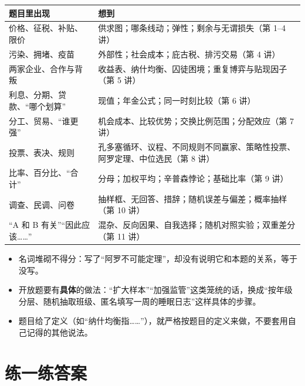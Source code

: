 \begin{center}
\small
\begin{tabular}{p{4.2cm}p{8.8cm}}
  \toprule
  题目里出现 & 想到 \\
  \midrule
  价格、征税、补贴、限价 & 供求图；哪条线动；弹性；剩余与无谓损失（第 1--4 讲） \\
  污染、拥堵、疫苗 & 外部性；社会成本；庇古税、排污交易（第 4 讲） \\
  两家企业、合作与背叛 & 收益表、纳什均衡、囚徒困境；重复博弈与贴现因子（第 5 讲） \\
  利息、分期、贷款、“哪个划算” & 现值；年金公式；同一时刻比较（第 6 讲） \\
  分工、贸易、“谁更强” & 机会成本、比较优势；交换比例范围；分配效应（第 7 讲） \\
  投票、表决、规则 & 孔多塞循环、议程、不同规则不同赢家、策略性投票、阿罗定理、中位选民（第 8 讲） \\
  比率、百分比、“合计” & 分母；加权平均；辛普森悖论；基础比率（第 9 讲） \\
  调查、民调、问卷 & 抽样框、无回答、措辞；随机误差与偏差；概率抽样（第 10 讲） \\
  “A 和 B 有关”“因此应该……” & 混杂、反向因果、自我选择；随机对照实验；双重差分（第 11 讲） \\
  \bottomrule
\end{tabular}
\end{center}

\begin{pitfall}
\begin{itemize}
  \item 名词堆砌不得分：写了“阿罗不可能定理”，却没有说明它和本题的关系，等于没写。
  \item 开放题要有\textbf{具体}的做法：“扩大样本”“加强监管”这类笼统的话，换成“按年级分层、随机抽取班级、匿名填写一周的睡眠日志”这样具体的步骤。
  \item 题目给了定义（如“纳什均衡指……”），就严格按题目的定义来做，不要套用自己记得的其他说法。
\end{itemize}
\end{pitfall}

\section{练一练答案}

